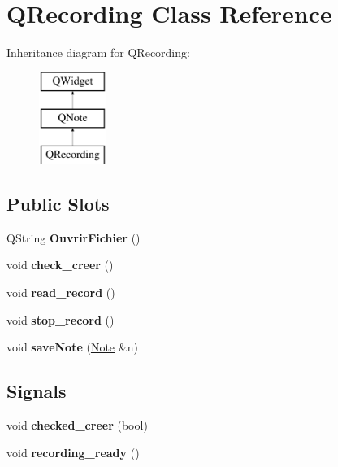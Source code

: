 \hypertarget{class_q_recording}{}\section{Q\+Recording Class Reference}
\label{class_q_recording}
Inheritance diagram for Q\+Recording\+:\begin{figure}[H]
\begin{center}
\leavevmode
\includegraphics[height=3.000000cm]{class_q_recording}
\end{center}
\end{figure}
\subsection*{Public Slots}
\begin{DoxyCompactItemize}
\item 
\mbox{\label{class_q_recording_a9eaf976da6c3c768d15a5e53f3982753}} 
Q\+String {\bfseries Ouvrir\+Fichier} ()
\item 
\mbox{\label{class_q_recording_ad889ab95e55e1ce9ebff8726aa916fe2}} 
void {\bfseries check\+\_\+creer} ()
\item 
\mbox{\label{class_q_recording_a5c5c221fed1648c1813da1f195e26663}} 
void {\bfseries read\+\_\+record} ()
\item 
\mbox{\label{class_q_recording_a35476e910a18814b7beb0e73819279d8}} 
void {\bfseries stop\+\_\+record} ()
\item 
\mbox{\label{class_q_recording_a37492f3dbda2dad2a8cd62012fe91b78}} 
void {\bfseries save\+Note} (\hyperlink{class_note}{Note} \&n)
\end{DoxyCompactItemize}
\subsection*{Signals}
\begin{DoxyCompactItemize}
\item 
\mbox{\label{class_q_recording_a6a2b27ca530a1b1da1f97759c7742206}} 
void {\bfseries checked\+\_\+creer} (bool)
\item 
\mbox{\label{class_q_recording_aee0cf464a60e91f566bcff3d3caa3534}} 
void {\bfseries recording\+\_\+ready} ()
\end{DoxyCompactItemize}
